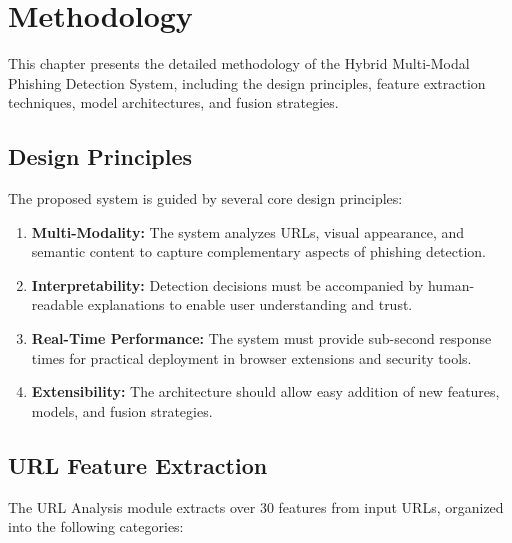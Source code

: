 \documentclass[12pt,a4paper]{report}
\begin{document}
\chapter{Methodology}

This chapter presents the detailed methodology of the Hybrid Multi-Modal Phishing Detection System, including the design principles, feature extraction techniques, model architectures, and fusion strategies.

\section{Design Principles}

The proposed system is guided by several core design principles:

\begin{enumerate}
    \item \textbf{Multi-Modality:} The system analyzes URLs, visual appearance, and semantic content to capture complementary aspects of phishing detection.
    
    \item \textbf{Interpretability:} Detection decisions must be accompanied by human-readable explanations to enable user understanding and trust.
    
    \item \textbf{Real-Time Performance:} The system must provide sub-second response times for practical deployment in browser extensions and security tools.
    
    \item \textbf{Extensibility:} The architecture should allow easy addition of new features, models, and fusion strategies.
\end{enumerate}

\section{URL Feature Extraction}

The URL Analysis module extracts over 30 features from input URLs, organized into the following categories:
\end{document}
